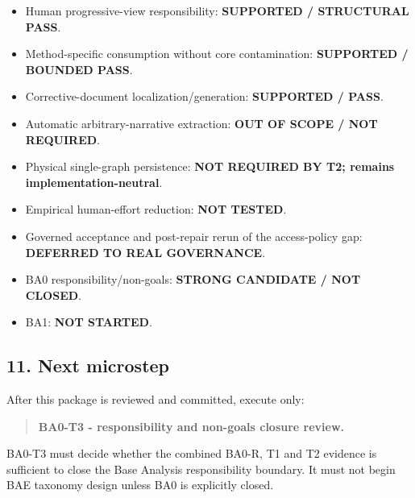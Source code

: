 \documentclass[
  10pt,
  a4paper,
]{article}
\providecommand{\tightlist}{%
  \setlength{\itemsep}{0pt}\setlength{\parskip}{0pt}}
\begin{document}
\begin{itemize}
\tightlist
\item
  Human progressive-view responsibility: \textbf{SUPPORTED / STRUCTURAL
  PASS}.
\item
  Method-specific consumption without core contamination:
  \textbf{SUPPORTED / BOUNDED PASS}.
\item
  Corrective-document localization/generation: \textbf{SUPPORTED /
  PASS}.
\item
  Automatic arbitrary-narrative extraction: \textbf{OUT OF SCOPE / NOT
  REQUIRED}.
\item
  Physical single-graph persistence: \textbf{NOT REQUIRED BY T2; remains
  implementation-neutral}.
\item
  Empirical human-effort reduction: \textbf{NOT TESTED}.
\item
  Governed acceptance and post-repair rerun of the access-policy gap:
  \textbf{DEFERRED TO REAL GOVERNANCE}.
\item
  BA0 responsibility/non-goals: \textbf{STRONG CANDIDATE / NOT CLOSED}.
\item
  BA1: \textbf{NOT STARTED}.
\end{itemize}

\subsection{11. Next microstep}\label{11-next-microstep}

After this package is reviewed and committed, execute only:

\begin{quote}
\textbf{BA0-T3 - responsibility and non-goals closure review.}
\end{quote}

BA0-T3 must decide whether the combined BA0-R, T1 and T2 evidence is
sufficient to close the Base Analysis responsibility boundary. It must
not begin BAE taxonomy design unless BA0 is explicitly closed.
\end{document}

